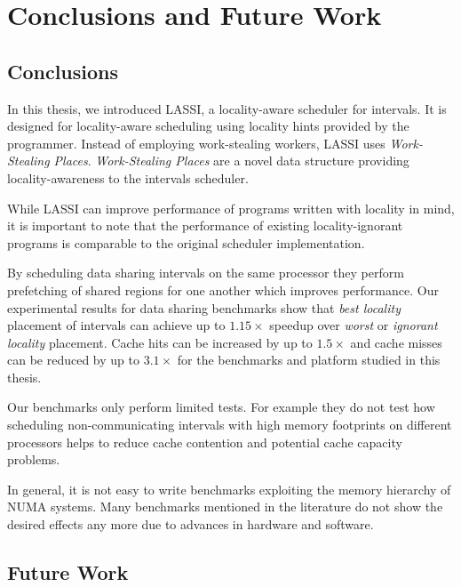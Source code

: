 
\chapter{Conclusions and Future Work}
\label{chap:locality-conclusions-and-future-work}

\section{Conclusions}
\label{sec:locality-conclusions-and-future-work-conclusions}

In this thesis, we introduced LASSI, a locality-aware scheduler for
intervals. It is designed for locality-aware scheduling using locality
hints provided by the programmer. Instead of employing work-stealing
workers, LASSI uses \emph{Work-Stealing Places}. \emph{Work-Stealing
  Places} are a novel data structure providing locality-awareness to
the intervals scheduler.

While LASSI can improve performance of programs written with locality
in mind, it is important to note that the performance of existing
locality-ignorant programs is comparable to the original scheduler
implementation.

By scheduling data sharing intervals on the same processor they
perform prefetching of shared regions for one another which improves
performance. Our experimental results for data sharing benchmarks show
that \emph{best locality} placement of intervals can achieve up to
$1.15\times$ speedup over \emph{worst} or \emph{ignorant locality}
placement. Cache hits can be increased by up to $1.5\times$ and cache
misses can be reduced by up to $3.1\times$ for the benchmarks and
platform studied in this thesis.

Our benchmarks only perform limited tests. For example they do not
test how scheduling non-communicating intervals with high memory
footprints on different processors helps to reduce cache contention
and potential cache capacity problems.

In general, it is not easy to write benchmarks exploiting the memory
hierarchy of NUMA systems. Many benchmarks mentioned in the literature
do not show the desired effects any more due to advances in hardware
and software.


\section{Future Work}
\label{sec:locality-conclusions-and-future-work-future-work}

